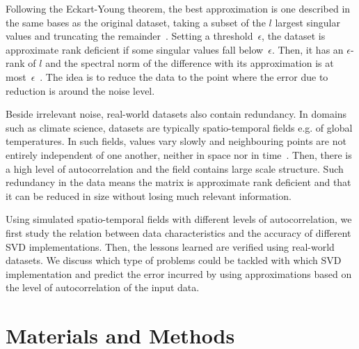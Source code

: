 \documentclass[ijgi,article,submit,moreauthors,pdftex,10pt,a4paper]{Definitions/mdpi}
\begin{document}
Following the Eckart-Young theorem, the best approximation is one described in the same bases as the original dataset, taking a subset of the $l$ largest singular values and truncating the remainder~\cite{Eckart1936}. Setting a threshold~$\epsilon$, the dataset is approximate rank deficient if some singular values fall below~$\epsilon$. Then, it has an $\epsilon$-rank of $l$ and the spectral norm of the difference with its approximation is at most~$\epsilon$~\cite{Martinsson2016}. The idea is to reduce the data to the point where the error due to reduction is around the noise level.

Beside irrelevant noise, real-world datasets also contain redundancy. In domains such as climate science, datasets are typically spatio-temporal fields e.g. of global temperatures. In such fields, values vary slowly and neighbouring points are not entirely independent of one another, neither in space nor in time~\cite{Eshel2011}. Then, there is a high level of autocorrelation and the field contains large scale structure. Such redundancy in the data means the matrix is approximate rank deficient and that it can be reduced in size without losing much relevant information.

Using simulated spatio-temporal fields with different levels of autocorrelation, we first study the relation between data characteristics and the accuracy of different SVD implementations. Then, the lessons learned are verified using real-world datasets. We discuss which type of problems could be tackled with which SVD implementation and predict the error incurred by using approximations based on the level of autocorrelation of the input data. 

\section{Materials and Methods}
\label{sec:Materials and Methods}

\end{document}
